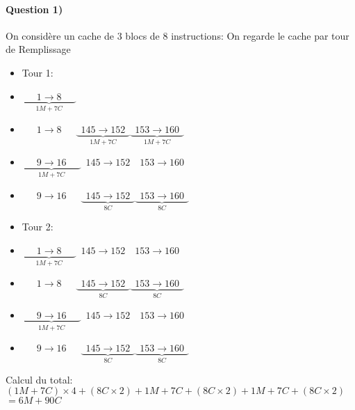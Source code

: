 \documentclass[12pt]{report}
\begin{document}
\paragraph*{Question 1)}
On considère un cache de 3 blocs de 8 instructions:
On regarde le cache par tour de Remplissage
\begin{itemize}
\item Tour 1:
\item $\underbrace{\boxed{\phantom{555} 1 \to 8 \phantom{555}}}_{1M +7C}\boxed{\phantom{55555555555}}\boxed{\phantom{55555555555}}$
\item $\boxed{\phantom{555} 1 \to 8 \phantom{555}}\underbrace{\boxed{\phantom{5} 145  \to 152 \phantom{5}}}_{1M +7C} \underbrace{\boxed{\phantom{5} 153  \to 160 \phantom{5}}}_{1M +7C}$
\item $\underbrace{\boxed{\phantom{555} 9 \to 16 \phantom{555}}}_{1M +7C}\boxed{\phantom{5} 145  \to 152 \phantom{5}} \boxed{\phantom{5} 153  \to 160 \phantom{5}}$
\item $\boxed{\phantom{555} 9 \to 16 \phantom{555}}\underbrace{\boxed{\phantom{5} 145  \to 152 \phantom{5}}}_{8C} \underbrace{\boxed{\phantom{5} 153  \to 160 \phantom{5}}}_{8C}$
\item Tour 2:
\item $\underbrace{\boxed{\phantom{555} 1 \to 8 \phantom{555}}}_{1M +7C}\boxed{\phantom{5} 145  \to 152 \phantom{5}} \boxed{\phantom{5} 153  \to 160 \phantom{5}}$
\item $\boxed{\phantom{555} 1 \to 8 \phantom{555}}\underbrace{\boxed{\phantom{5} 145  \to 152 \phantom{5}}}_{8C} \underbrace{\boxed{\phantom{5} 153  \to 160 \phantom{5}}}_{8C}$
\item $\underbrace{\boxed{\phantom{555} 9 \to 16 \phantom{555}}}_{1M +7C}\boxed{\phantom{5} 145  \to 152 \phantom{5}} \boxed{\phantom{5} 153  \to 160 \phantom{5}}$
\item $\boxed{\phantom{555} 9 \to 16 \phantom{555}}\underbrace{\boxed{\phantom{5} 145  \to 152 \phantom{5}}}_{8C} \underbrace{\boxed{\phantom{5} 153  \to 160 \phantom{5}}}_{8C}$
\end{itemize}

Calcul du total: $(1M + 7C) \times 4 + (8C \times 2) + 1M + 7C + (8C \times 2) + 1M + 7C + (8C \times 2) $ \\
$= 6M +  90C$
\end{document}
